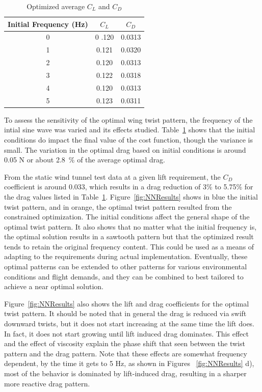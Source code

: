 \documentclass[11pt]{ucthesis}
\begin{document}
\begin{table}[h]
\caption{Optimized average $C_L$ and $C_D$}
\label{tab:drag}
\begin{center}
\begin{tabular}{|c||c||c|}
\hline
Initial Frequency (Hz)&$C_L$&$C_D$\\
\hline
0 &0 .120&0.0313\\
\hline
1 &0.121&0.0320 \\
\hline
2&0.120&0.0313\\
\hline
3&0.122&0.0318\\
\hline
4&0.120&0.0313\\
\hline
5&0.123&0.0311\\
\hline
\end{tabular}
\end{center}
\end{table}
To assess the sensitivity of the optimal wing twist pattern, the frequency of the intial sine wave was varied and its effects studied. Table~\ref{tab:drag} shows that the initial conditions do impact the final value of the cost function, though the variance is small. The variation in the optimal drag based on initial conditions is around 0.05 N or about 2.8~\% of the average optimal drag. 

From the static wind tunnel test data at a given lift requirement, the $C_D$ coefficient is around 0.033, which results in a drag reduction of 3\% to 5.75\% for the drag values listed in Table~\ref{tab:drag}. Figure~\ref{fig:NNResults} shows in blue the initial twist pattern, and in orange, the optimal twist pattern resulted from the constrained optimization. The initial conditions affect the general shape of the optimal twist pattern. It also shows that no matter what the initial frequency is, the optimal solution results in a sawtooth pattern but that the optimized result tends to retain the original frequency content. This could be used as a means of adapting to the requirements during actual implementation. Eventually, these optimal patterns can be extended to other patterns for various environmental conditions and flight demands, and they can be combined to best tailored to achieve a near optimal solution.

Figure~\ref{fig:NNResults} also shows the lift and drag coefficients for the optimal twist pattern. It should be noted that in general the drag is reduced via swift downward twists, but it does not start increasing at the same time the lift does. In fact, it does not start growing until lift induced drag dominates. This effect and the effect of viscosity explain the phase shift that seen between the twist pattern and the drag pattern. Note that these effects are somewhat frequency dependent, by the time it gets to 5 Hz, as shown in Figures ~\ref{fig:NNResults} d), most of the behavior is dominated by lift-induced drag, resulting in a sharper more reactive drag pattern.
\end{document}
